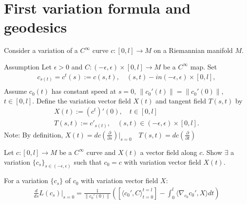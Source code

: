 \section{First variation formula and geodesics}
Consider a variation of a $C^{\infty}$ curve $c : [0, l] \to M$ on a Riemannian manifold $M$.

\begin{proposition}
Assumption Let $\epsilon > 0 $ and $C: (-\epsilon, \epsilon) \times [0,l] \to M$
be a $C^{\infty}$ map.
Set 
\[
\begin{aligned}
    c_{s(t)} = c^t(s) := c(s,t), \quad (s,t) -in (-\epsilon, \epsilon) \times [0,l], \\
\end{aligned}
\]
Assume $c_0 (t)$ has constant speed at $s=0$, $\|c_0'(t)\| = \|c_0'(0)\|$, $t\in [0,l]$.
Define the variation vector field $X(t)$ and tangent field $T(s,t)$ by
\[
\begin{aligned}
    X(t) := (c^t)'(0), \quad t \in [0,l] \\
    T(s,t) := c'_{s(t)}, \quad (s,t) \in (-\epsilon, \epsilon) \times [0,l].
\end{aligned}
\]
Note: By definition, $X(t) = dc (\frac{\partial}{\partial s})|_{s=0} \quad T(s,t) = dc(\frac{\partial}{\partial t})$
\end{proposition}

\begin{problem}
    Let $c:[0,l] \to M$ be a $C^{\infty}$ curve and $X(t)$
    a vector field along $c$. Show $\exists$ a variation $\{c_s\}_{s \in (-\epsilon, \epsilon)}$
    such that $c_0 = c $ with variation vector field $X(t)$.
    \label{prob:10}
\end{problem}

\begin{theorem}
    For a variation $\{c_s\}$ of $c_0$ with variation vector field $X$:
    \[
    \begin{aligned}
        \frac{d}{ds} L(c_s)|_{s=0} = \frac{1}{\|c_0'(0)\|} \left( [\langle c_0', C \rangle_{t=0}^{t=l}]- \int_0^l \langle \nabla_{c_0}c_0', X \rangle dt \right)
    \end{aligned}
    \]
    \label{theorem:7.2}
\end{theorem}

